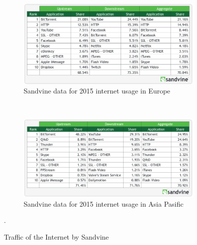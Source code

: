 \begin{figure}[h]
	\centering
	\begin{subfigure}[b]{0.8\textwidth}
		\includegraphics[width=\linewidth]{pics/sandvineeu2015}
		\caption{Sandvine data for 2015 internet usage in Europe}
		\label{fig:usage1}
	\end{subfigure}\\
	\begin{subfigure}[b]{0.8\textwidth}
		\includegraphics[width=\linewidth]{pics/sandvineasia2015}
		\caption{Sandvine data for 2015 internet usage in Asia Pasific}
		\label{fig:usage2}
	\end{subfigure}%
	\caption{Traffic of the Internet by Sandvine \cite{2015:internettraffic:sandvine}}.
	\label{fig:usage}
\end{figure}

